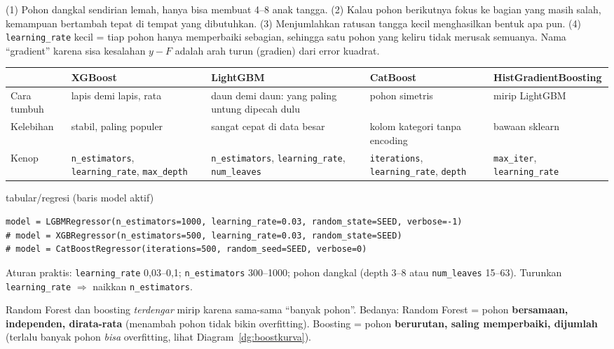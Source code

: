 \documentclass[10pt,a4paper]{article}
\newcommand{\kode}[1]{\texttt{\small #1}}
\begin{document}
\begin{kenapa}
(1) Pohon dangkal sendirian lemah, hanya bisa membuat 4--8 anak tangga. (2) Kalau pohon berikutnya fokus ke bagian yang masih
salah, kemampuan bertambah tepat di tempat yang dibutuhkan. (3) Menjumlahkan ratusan tangga kecil menghasilkan bentuk apa pun.
(4) \kode{learning\_rate} kecil = tiap pohon hanya memperbaiki sebagian, sehingga satu pohon yang keliru tidak merusak semuanya.
Nama ``gradient'' karena sisa kesalahan $y - F$ adalah arah turun (gradien) dari error kuadrat.
\end{kenapa}

{\small
\begin{tabularx}{\linewidth}{@{}P{2.6cm}XXXX@{}}
\toprule
 & \textbf{XGBoost} & \textbf{LightGBM} & \textbf{CatBoost} & \textbf{HistGradient\-Boosting}\\ \midrule
Cara tumbuh & lapis demi lapis, rata & daun demi daun: yang paling untung dipecah dulu & pohon simetris & mirip LightGBM\\
Kelebihan & stabil, paling populer & sangat cepat di data besar & kolom kategori tanpa encoding & bawaan sklearn\\
Kenop & \kode{n\_estimators}, \kode{learning\_rate}, \kode{max\_depth} & \kode{n\_estimators}, \kode{learning\_rate},
\kode{num\_leaves} & \kode{iterations}, \kode{learning\_rate}, \kode{depth} & \kode{max\_iter}, \kode{learning\_rate}\\ \bottomrule
\end{tabularx}}

\begin{soal}{tabular/regresi (baris model aktif)}
\begin{lstlisting}
model = LGBMRegressor(n_estimators=1000, learning_rate=0.03, random_state=SEED, verbose=-1)
# model = XGBRegressor(n_estimators=500, learning_rate=0.03, random_state=SEED)
# model = CatBoostRegressor(iterations=500, random_seed=SEED, verbose=0)
\end{lstlisting}
Aturan praktis: \kode{learning\_rate} 0,03--0,1; \kode{n\_estimators} 300--1000; pohon dangkal (depth 3--8 atau
\kode{num\_leaves} 15--63). Turunkan \kode{learning\_rate} $\Rightarrow$ naikkan \kode{n\_estimators}.
\end{soal}

\begin{jebak}
Random Forest dan boosting \emph{terdengar} mirip karena sama-sama ``banyak pohon''. Bedanya: Random Forest = pohon
\textbf{bersamaan, independen, dirata-rata} (menambah pohon tidak bikin overfitting). Boosting = pohon \textbf{berurutan, saling
memperbaiki, dijumlah} (terlalu banyak pohon \emph{bisa} overfitting, lihat Diagram~\ref{dg:boostkurva}).
\end{jebak}
\end{document}
